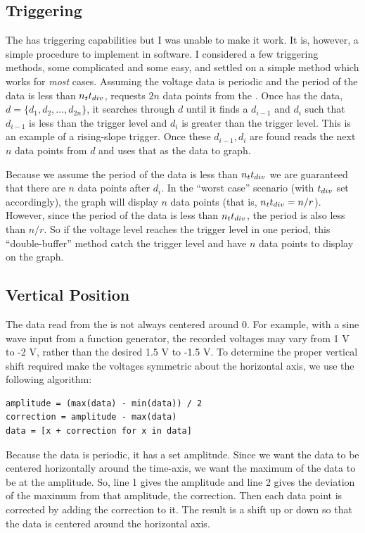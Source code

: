\documentclass[12pt,reqno]{amsart}
\begin{document}
\subsection{Triggering}
The \device{} has triggering capabilities\nidaq{} but I was unable to make it work. It is, however, a simple procedure to implement in software. I considered a few triggering methods, some complicated and some easy, and settled on a simple method which works for \textit{most} cases. Assuming the voltage data is periodic and the period of the data is less than $n_tt_{div}$, \progname{} requests $2n$ data points from the \device{}. Once \progname{} has the data, $d = \{d_1, d_2, \dots, d_{2n}\}$, it searches through $d$ until it finds a $d_{i-1}$ and $d_i$ such that $d_{i-1}$ is less than the trigger level and $d_i$ is greater than the trigger level. This is an example of a rising-slope trigger. Once these $d_{i-1}, d_i$ are found \progname{} reads the next $n$ data points from $d$ and uses that as the data to graph. 

Because we assume the period of the data is less than $n_tt_{div}$ we are guaranteed that there are $n$ data points after $d_i$. In the ``worst case'' scenario (with $t_{div}$ set accordingly), the graph will display $n$ data points (that is, $n_tt_{div} = n/r$). However, since the period of the data is less than $n_tt_{div}$, the period is also less than $n/r$. So if the voltage level reaches the trigger level in one period, this ``double-buffer'' method catch the trigger level and have $n$ data points to display on the graph.

\subsection{Vertical Position}
The data read from the \device{} is not always centered around 0. For example, with a sine wave input from a function generator, the recorded voltages may vary from 1 V to -2 V, rather than the desired 1.5 V to -1.5 V. To determine the proper vertical shift required make the voltages symmetric about the horizontal axis, we use the following algorithm:
\begin{verbatim}
amplitude = (max(data) - min(data)) / 2
correction = amplitude - max(data)
data = [x + correction for x in data]
\end{verbatim}
Because the data is periodic, it has a set amplitude. Since we want the data to be centered horizontally around the time-axis, we want the maximum of the data to be at the amplitude. So, line 1 gives the amplitude and line 2 gives the deviation of the maximum from that amplitude, the correction. Then each data point is corrected by adding the correction to it. The result is a shift up or down so that the data is centered around the horizontal axis.
\end{document}
